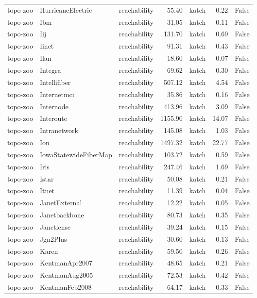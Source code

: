 \begin{tabular}{lllrlrr}
topo-zoo & HurricaneElectric & reachability & 55.40 & katch & 0.22 & False \\
topo-zoo & Ibm & reachability & 31.05 & katch & 0.11 & False \\
topo-zoo & Iij & reachability & 131.70 & katch & 0.69 & False \\
topo-zoo & Iinet & reachability & 91.31 & katch & 0.43 & False \\
topo-zoo & Ilan & reachability & 18.60 & katch & 0.07 & False \\
topo-zoo & Integra & reachability & 69.62 & katch & 0.30 & False \\
topo-zoo & Intellifiber & reachability & 507.12 & katch & 4.54 & False \\
topo-zoo & Internetmci & reachability & 35.86 & katch & 0.16 & False \\
topo-zoo & Internode & reachability & 413.96 & katch & 3.09 & False \\
topo-zoo & Interoute & reachability & 1155.90 & katch & 14.07 & False \\
topo-zoo & Intranetwork & reachability & 145.08 & katch & 1.03 & False \\
topo-zoo & Ion & reachability & 1497.32 & katch & 22.77 & False \\
topo-zoo & IowaStatewideFiberMap & reachability & 103.72 & katch & 0.59 & False \\
topo-zoo & Iris & reachability & 247.46 & katch & 1.69 & False \\
topo-zoo & Istar & reachability & 50.08 & katch & 0.21 & False \\
topo-zoo & Itnet & reachability & 11.39 & katch & 0.04 & False \\
topo-zoo & JanetExternal & reachability & 12.22 & katch & 0.05 & False \\
topo-zoo & Janetbackbone & reachability & 80.73 & katch & 0.35 & False \\
topo-zoo & Janetlense & reachability & 39.24 & katch & 0.15 & False \\
topo-zoo & Jgn2Plus & reachability & 30.60 & katch & 0.13 & False \\
topo-zoo & Karen & reachability & 59.50 & katch & 0.26 & False \\
topo-zoo & KentmanApr2007 & reachability & 48.65 & katch & 0.21 & False \\
topo-zoo & KentmanAug2005 & reachability & 72.53 & katch & 0.42 & False \\
topo-zoo & KentmanFeb2008 & reachability & 64.17 & katch & 0.33 & False \\

\end{tabular}
